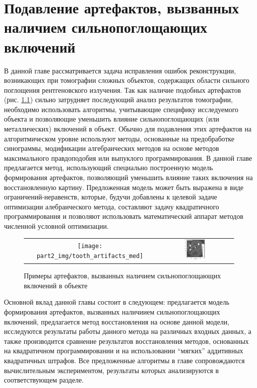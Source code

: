 \chapter{Подавление артефактов, вызванных наличием сильнопоглощающих включений} \label{chapt2}


В данной главе рассматривается задача исправления ошибок реконструкции, возникающих при томографии сложных объектов, содержащих области сильного поглощения рентгеновского излучения.
Так как наличие подобных артефактов (рис. \ref{im:high_absorb_artifacts}) сильно затрудняет последующий анализ результатов томографии, необходимо использовать алгоритмы, учитывающие специфику исследуемого объекта и позволяющие уменьшить влияние сильнопоглощающих (или металлических) включений в объект.
Обычно для подавления этих артефактов на алгоритмическом уровне используют методы, основанные на предобработке синограммы, модификации алгебраических методов на основе методов максимального правдоподобия или выпуклого программирования.
В данной главе предлагается метод, использующий специально построенную модель формирования артефактов, позволяющий уменьшить влияние таких включения на восстановленную картину.
Предложенная модель может быть выражена в виде ограничений-неравенств, которые, будучи добавлены к целевой задаче оптимизации алебраического метода, составляют задачу квадратичного программирования и позволяют использовать математический аппарат методов численной условной оптимизации.

\begin{figure}
\centering
\begin{tabular}{@{}c@{}c}
  \texttt{[image: part2\_img/tooth\_artifacts\_med]}
  &
  \includegraphics[width=0.3\textwidth]{../Presentation/images/high_absorb_artifacts}
\\
\end{tabular}
\caption{Примеры артефактов, вызванных наличием сильнопоглощающих включений в объекте}
\label{im:high_absorb_artifacts}
\end{figure}

Основной вклад данной главы состоит в следующем: предлагается модель формирования артефактов, вызванных наличиием сильнопоглощающих включений, предлагается метод восстановления на основе данной модели, исследуются результаты работы данного метода на различных входных данных, а также производится сравнение результатов восстановления методов, основанных на квадратичном программировании и на использовании ``мягких'' аддитивных квадратичных штрафов. 
Все предложенные алгоритмы в главе сопровождаются вычислительным экспериментом, результаты которых анализируются в соответствующем разделе.


